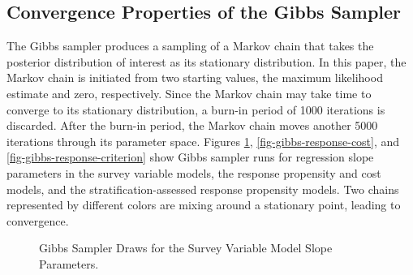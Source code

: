 \documentclass[12pt]{article}
\makeatletter
\def\fixFloatSize#1{}%
\makeatother
\begin{document}
\begin{appendices}
\section{Convergence Properties of the Gibbs Sampler}\label{appendix-title-convergence-properties-gibbs-sampler}

The Gibbs sampler produces a sampling of a Markov chain that takes the posterior distribution of interest as its stationary distribution.
In this paper, the Markov chain is initiated from two starting values, the maximum likelihood estimate and zero, respectively.
Since the Markov chain may take time to converge to its stationary distribution, a burn-in period of 1000 iterations is discarded.
After the burn-in period, the Markov chain moves another 5000 iterations through its parameter space.
Figures \ref{fig-gibbs-survey-variables}, \ref{fig-gibbs-response-cost}, and \ref{fig-gibbs-response-criterion} show Gibbs sampler runs for regression slope parameters in the survey variable models, the response propensity and cost models, and the stratification-assessed response propensity models.
Two chains represented by different colors are mixing around a stationary point, leading to convergence.
\bgroup
\fixFloatSize{images/GibbsSvyVar.png}
\begin{figure}[!htbp]
\centering \makeatletter{}
\makeatother 
\caption{{Gibbs Sampler Draws for the Survey Variable Model Slope Parameters.}}
\label{fig-gibbs-survey-variables}
\end{figure}
\egroup


\end{appendices}
\end{document}
